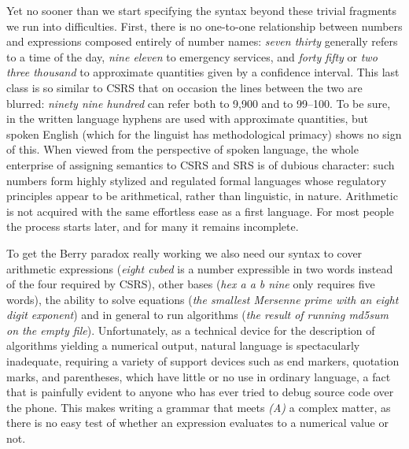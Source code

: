 \medskip\noindent Yet no sooner than we start specifying the syntax beyond
these trivial fragments we run into difficulties. First, there is no
one-to-one relationship between numbers and expressions composed entirely of
number names: {\it seven thirty} generally refers to a time of the day, {\it
  nine eleven} to emergency services, and {\it forty fifty} or {\it two three
  thousand} to approximate quantities given by a confidence interval. This
last class is so similar to CSRS that on occasion the lines between the two
are blurred: {\it ninety nine hundred} can refer both to 9,900 and to
99--100. To be sure, in the written language hyphens are used with approximate
quantities, but spoken English (which for the linguist has methodological
primacy) shows no sign of this.  When viewed from the perspective of spoken
language, the whole enterprise of assigning semantics to CSRS and SRS is of
dubious character: such numbers form highly stylized and regulated formal
languages whose regulatory principles appear to be arithmetical, rather than
linguistic, in nature. Arithmetic is not acquired with the same effortless
ease as a first language. For most people the process starts later, and for
many it remains incomplete.

To get the Berry paradox really working we also need our syntax to cover
arithmetic expressions ({\it eight cubed} is a number expressible in two words
instead of the four required by CSRS), other bases ({\it hex a a b nine} only
requires five words), the ability to solve equations ({\it the smallest
  Mersenne prime with an eight digit exponent}) and in general to run
algorithms ({\it the result of running md5sum on the empty
  file}). Unfortunately, as a technical device for the description of
algorithms yielding a numerical output, natural language is spectacularly
inadequate, requiring a variety of support devices such as end markers,
quotation marks, and parentheses, which have little or no use in ordinary
language, a fact that is painfully evident to anyone who has ever tried to
debug source code over the phone. This makes writing a grammar that meets {\sl
  (A)} a complex matter, as there is no easy test of whether an expression
evaluates to a numerical value or not.

